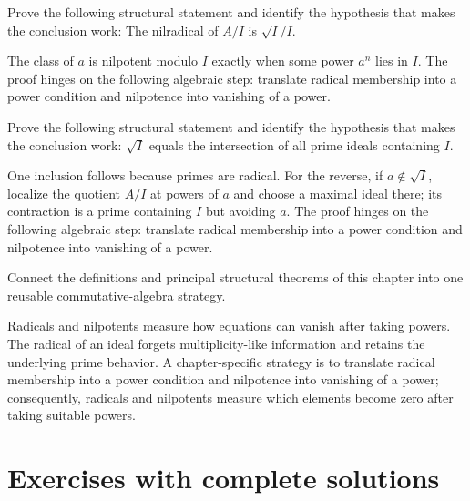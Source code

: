 \begin{problem}\label{prob:v03-problem-10}
Prove the following structural statement and identify the hypothesis that makes the conclusion work: The nilradical of $A/I$ is $\sqrt I/I$.
\end{problem}
\begin{solution}
The class of $a$ is nilpotent modulo $I$ exactly when some power $a^n$ lies in $I$. The proof hinges on the following algebraic step: translate radical membership into a power condition and nilpotence into vanishing of a power.
\end{solution}

\begin{problem}\label{prob:v03-problem-11}
Prove the following structural statement and identify the hypothesis that makes the conclusion work: $\sqrt I$ equals the intersection of all prime ideals containing $I$.
\end{problem}
\begin{solution}
One inclusion follows because primes are radical. For the reverse, if $a\notin\sqrt I$, localize the quotient $A/I$ at powers of $a$ and choose a maximal ideal there; its contraction is a prime containing $I$ but avoiding $a$. The proof hinges on the following algebraic step: translate radical membership into a power condition and nilpotence into vanishing of a power.
\end{solution}

\begin{problem}\label{prob:v03-problem-12}
Connect the definitions and principal structural theorems of this chapter into one reusable commutative-algebra strategy.
\end{problem}
\begin{solution}
Radicals and nilpotents measure how equations can vanish after taking powers. The radical of an ideal forgets multiplicity-like information and retains the underlying prime behavior. A chapter-specific strategy is to translate radical membership into a power condition and nilpotence into vanishing of a power; consequently, radicals and nilpotents measure which elements become zero after taking suitable powers.
\end{solution}

\section{Exercises with complete solutions}

